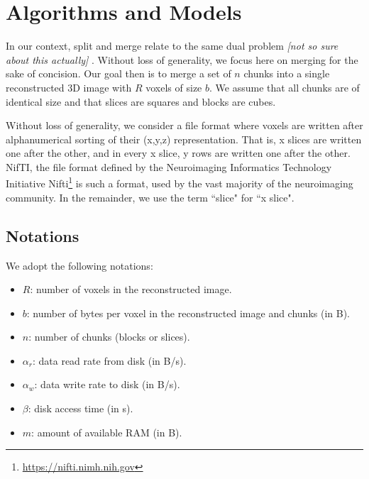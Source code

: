 \documentclass[10pt, conference, compsocconf]{IEEEtran}
\newcommand{\todo}[1]{
  \color{red}\emph{[#1]}
  \color{black}
}
\begin{document}
\section{Algorithms and Models}
\label{sec:algos}

In our context, split and merge relate to the same dual
problem \todo{not so sure about this actually}. Without loss of
generality, we focus here on merging for the sake of concision. Our
goal then is to merge a set of $n$ chunks into a single reconstructed
3D image with $R$ voxels of size $b$. We assume that all chunks are of
identical size and that slices are squares and blocks are cubes.

Without loss of generality, we consider a file format where voxels are
written after alphanumerical sorting of their (x,y,z)
representation. That is, x slices are written one after the other, and
in every x slice, y rows are written one after the other. NifTI, the
file format defined by the Neuroimaging Informatics Technology
Initiative Nifti\footnote{\url{https://nifti.nimh.nih.gov}} is such a
format, used by the vast majority of the neuroimaging community. In
the remainder, we use the term ``slice" for ``x slice".

\subsection{Notations}

We adopt the following notations:
\begin{itemize}
\item $R$: number of voxels in the reconstructed image.
\item $b$: number of bytes per voxel in the reconstructed image and chunks (in B).
\item $n$: number of chunks (blocks or slices).
\item $\alpha_r$: data read rate from disk (in B/s).
\item $\alpha_w$: data write rate to disk (in B/s).
\item $\beta$: disk access time (in s).
\item $m$: amount of available RAM (in B).
\end{itemize}
\end{document}
